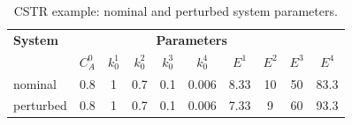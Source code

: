 \documentclass{article}
\begin{document}
\begin{table}[b]
\centering
\caption{CSTR example: nominal and perturbed system parameters.}
\begin{tabular}{l | c  c  c  c c c c c c}
 \hspace*{-0.15cm} \textbf{System} \! \!  \hspace*{-0.2cm}& \multicolumn{8}{c}{\textbf{Parameters}} \\
                &\! \! \hspace*{-0.33cm} $C_{A}^0$ \! \! \hspace*{-0.2cm} &\! \! \hspace*{-0.33cm} $k_{0}^{1}$ \! \! & \! \! \hspace*{-0.33cm} $k_{0}^{2}$ & \! \! \hspace*{-0.33cm} $k_{0}^{3}$ & \! \! \hspace*{-0.33cm} $k_{0}^{4}$ & \! \! \hspace*{-0.33cm} $E^{1}$ & \! \! \hspace*{-0.33cm} $E^{2}$ & \! \! \hspace*{-0.33cm} $E^{3}$ & $E^{4}$ \\ %
\hline
%
\hspace*{-0.15cm} nominal   \!\!  \hspace*{-0.2cm}    &\! \! \hspace*{-0.33cm} 0.8 \! \! \hspace*{-0.2cm}  & \! \! \hspace*{-0.33cm} 1 \! \!  & \! \! \hspace*{-0.33cm} 0.7& \! \! \hspace*{-0.33cm} 0.1 & \! \! \hspace*{-0.33cm} 0.006 & \! \! \hspace*{-0.33cm}  8.33 & \! \! \hspace*{-0.33cm} 10 & \! \! \hspace*{-0.33cm} 50 & \! \! \hspace*{-0.33cm} 83.3 \\
%
\hspace*{-0.15cm} perturbed \!\!  \hspace*{-0.2cm}    &\! \! \hspace*{-0.33cm} 0.8 \! \! \hspace*{-0.2cm} & \! \! \hspace*{-0.33cm} 1 \! \!  & \! \! \hspace*{-0.33cm} 0.7& \! \! \hspace*{-0.33cm} 0.1 & \! \! \hspace*{-0.33cm} 0.006 & \! \! \hspace*{-0.33cm} 7.33 & \! \! \hspace*{-0.33cm}  9 & \! \! \hspace*{-0.33cm} 60 & \! \! \hspace*{-0.33cm} 93.3 \\
\hline
\end{tabular}
\label{tab:CSTR_coefficients}
\end{table}
\end{document}
